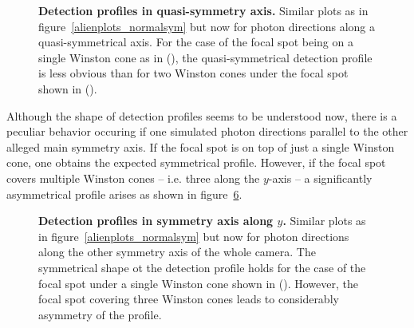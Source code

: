 \begin{figure}[H]
	\centering	
	\begin{subfigure}[t]{0.492\textwidth}
		\label{alienplots_quasisym:1}
	\end{subfigure}
	\hfill
	\begin{subfigure}[t]{0.492\textwidth}
		\label{alienplots_quasisym:2}
	\end{subfigure}
	\caption[Detection profiles in quasi-symmetry axis]{\textbf{Detection profiles in quasi-symmetry axis.} Similar plots as in figure~\ref{alienplots_normalsym} but now for photon directions along a quasi-symmetrical axis. For the case of the focal spot being on a single Winston cone as in (), the quasi-symmetrical detection profile is less obvious than for two Winston cones under the focal spot shown in ().}
	\label{alienplots_quasisym}
\end{figure}

Although the shape of detection profiles seems to be understood now, there is a peculiar behavior occuring if one simulated photon directions parallel to the other alleged main symmetry axis. If the focal spot is on top of just a single Winston cone, one obtains the expected symmetrical profile. However, if the focal spot covers multiple Winston cones -- i.e. three along the $y$-axis -- a significantly asymmetrical profile arises as shown in figure~\ref{alienplots_strangesym}.\\

\begin{figure}[H]
	\centering
	\begin{subfigure}[t]{0.492\textwidth}
		\label{alienplots_strangesym:1}
	\end{subfigure}
	\hfill
	\begin{subfigure}[t]{0.492\textwidth}
		\label{alienplots_strangesym:2}
	\end{subfigure}
	\caption[Detection profiles in symmetry axis along $x$]{\textbf{Detection profiles in symmetry axis along $y$.} Similar plots as in figure~\ref{alienplots_normalsym} but now for photon directions along the other symmetry axis of the whole camera. The symmetrical shape ot the detection profile holds for the case of the focal spot under a single Winston cone shown in (). However, the focal spot covering three Winston cones leads to considerably asymmetry of the profile.}
	\label{alienplots_strangesym}
\end{figure}

